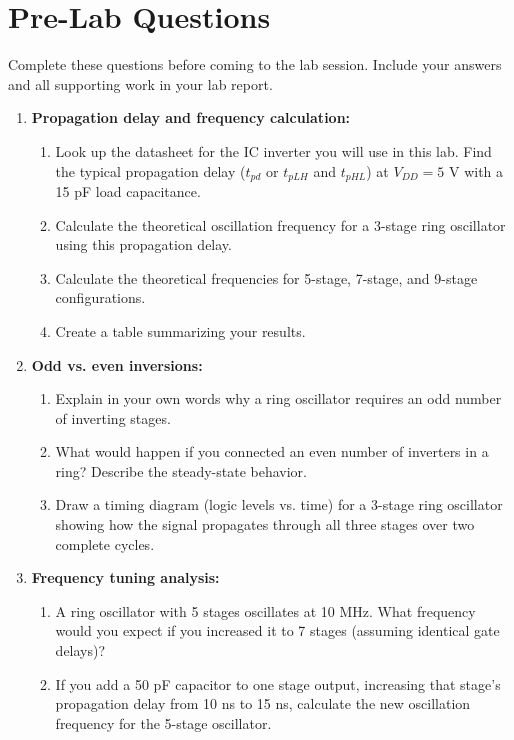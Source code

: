 \documentclass[10pt]{article}
\begin{document}
\section{Pre-Lab Questions}
\label{sec:prelab}

Complete these questions before coming to the lab session.  Include your answers and all supporting work in your lab report.

\begin{enumerate}
    
    \item \textbf{Propagation delay and frequency calculation:}
    \begin{enumerate}
        \item Look up the datasheet for the IC inverter you will use in this lab. Find the typical propagation delay ($t_{pd}$ or $t_{pLH}$ and $t_{pHL}$) at $V_{DD} = 5$ V with a 15 pF load capacitance.
        \item Calculate the theoretical oscillation frequency for a 3-stage ring oscillator using this propagation delay.
        \item Calculate the theoretical frequencies for 5-stage, 7-stage, and 9-stage configurations.
        \item Create a table summarizing your results.
    \end{enumerate}
    
    \item \textbf{Odd vs. even inversions:}
    \begin{enumerate}
        \item Explain in your own words why a ring oscillator requires an odd number of inverting stages.
        \item What would happen if you connected an even number of inverters in a ring? Describe the steady-state behavior.
        \item Draw a timing diagram (logic levels vs. time) for a 3-stage ring oscillator showing how the signal propagates through all three stages over two complete cycles.
    \end{enumerate}
    
    \item \textbf{Frequency tuning analysis:}
    \begin{enumerate}
        \item A ring oscillator with 5 stages oscillates at 10 MHz. What frequency would you expect if you increased it to 7 stages (assuming identical gate delays)?
        \item If you add a 50 pF capacitor to one stage output, increasing that stage's propagation delay from 10 ns to 15 ns, calculate the new oscillation frequency for the 5-stage oscillator.
    \end{enumerate}
    
\end{enumerate}
\end{document}
